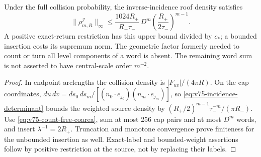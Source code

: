 \begin{corollary}
\label{cor:v75-inverse-incidence}
Under the full collision probability, the inverse-incidence roof
density satisfies
\begin{equation}\label{eq:v75-explicit-inverse-height}
 \|\rho^{\mathcal I}_{m,R}\|_\infty
 \le \frac{1024R_+}{R_-\tau_-}\,
             D^m\left(\frac{R_+}{2\tau_-}\right)^{m-1}.
\end{equation}
A positive exact-return restriction has this upper bound divided by
$c_*$; a bounded insertion costs its supremum norm. The geometric
factor formerly needed to count or turn all level components of a
word is absent. The remaining word sum is not asserted to have
central-scale order $m^{-2}$.
\end{corollary}
\begin{proof}
In endpoint arclengths the collision density is
$|F_{uv}|/(4\pi R)$. On the cap coordinates,
$du\,dv=ds_0\,ds_m/[(n_0\cdot e_{j_0})(n_m\cdot e_{j_m})]$,
so \eqref{eq:v75-incidence-determinant} bounds the weighted source
density by
$(R_+/2)^{m-1}\tau_-^{-m}/(\pi R_-)$.
Use \eqref{eq:v75-count-free-coarea}, sum at most 256 cap pairs
and at most $D^m$ words, and insert $\lambda^{-1}=2R_+$.
Truncation and monotone convergence prove finiteness for the unbounded
insertion as well. Exact-label and bounded-weight assertions follow
by positive restriction at the source, not by replacing their labels.
\end{proof}

